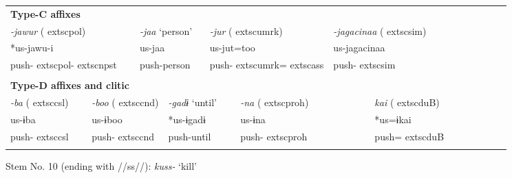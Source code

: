 \begin{tabularx}{\textwidth}{XXm{}XXXXXXXXXXXXXXXXXXXX}
\multicolumn{23}{X}{{\bfseries Type-C affixes}}\\
\multicolumn{4}{X}{{ \textit{{}-jawur} (	extsc{pol})}} & \multicolumn{3}{X}{{ \textit{{}-jaa} ‘person’}} & \multicolumn{5}{X}{{ \textit{{}-jur} (	extsc{umrk})}} & \multicolumn{4}{X}{{ \textit{{}-jagacinaa} (	extsc{sim})}} & \multicolumn{7}{X}{}\\
\multicolumn{4}{X}{{ *us-jawu-i}} & \multicolumn{3}{X}{us-jaa} & \multicolumn{5}{X}{us-jut=too} & \multicolumn{4}{X}{{ us-jagacinaa}} & \multicolumn{7}{X}{}\\
\multicolumn{4}{X}{push-	extsc{pol}-	extsc{npst}} & \multicolumn{3}{X}{push-person} & \multicolumn{5}{X}{push-	extsc{umrk}=	extsc{ass}} & \multicolumn{4}{X}{push-	extsc{sim}} & \multicolumn{7}{X}{}\\
\multicolumn{23}{X}{}\\
\multicolumn{23}{X}{{\bfseries Type-D affixes and clitic}}\\
{ \textit{{}-ba} (	extsc{csl})} & \multicolumn{4}{X}{{ \textit{{}-boo} (	extsc{cnd})}} & \multicolumn{4}{X}{{ \textit{{}-gadɨ} ‘until’}} & \multicolumn{4}{X}{{ \textit{{}-na} (	extsc{proh})}} & \multicolumn{4}{X}{{ \textit{kai} (	extsc{du}B)}} & \multicolumn{6}{X}{}\\
{ us-ɨba} & \multicolumn{4}{X}{{ us-ɨboo}} & \multicolumn{4}{X}{{ *us-ɨgadɨ}} & \multicolumn{4}{X}{{ us-ɨna}} & \multicolumn{4}{X}{{ *us=ɨkai}} & \multicolumn{6}{X}{}\\
push-	extsc{csl} & \multicolumn{4}{X}{push-	extsc{cnd}} & \multicolumn{4}{X}{push-until} & \multicolumn{4}{X}{push-	extsc{proh}} & \multicolumn{4}{X}{push=	extsc{du}B} & \multicolumn{6}{X}{}\\
\lspbottomrule
\end{tabularx}
Stem No. 10 (ending with //ss//): \textit{kuss-} ‘kill’

\tablefirsthead{}

